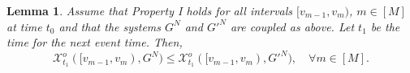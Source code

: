 \documentclass[11pt, reqno]{article}
\newtheorem{lemma}[theorem]{Lemma}
\numberwithin{equation}{section}
\numberwithin{theorem}{section}
\begin{document}
\begin{lemma}\label{lem:GN-G'N}
Assume that \textit{Property I} holds for all intervals $[v_{m-1},v_m)$, $m\in[M]$ at time $t_0$ and 
that the systems $G^N$ and $G'^N$ are coupled as above. 
Let $t_1$ be the time for the next event time. Then,
\begin{equation}\label{eq:order-weighted-queue}
    \mathcal{X}^o_{t_1}([v_{m-1},v_m),G^N)\leq \mathcal{X}^o_{t_1}([v_{m-1},v_m),G'^N),\quad \forall m\in[M].
\end{equation}
\end{lemma}
\end{document}
